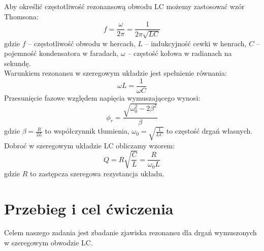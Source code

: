 \documentclass{article}
\begin{document}
Aby określić częstotliwość rezonansową obwodu LC możemy zastosować wzór Thomsona:
$$f= \frac{\omega}{2\pi} = \frac{1}{2\pi \sqrt{LC}}$$
gdzie $f$ – częstotliwość obwodu w hercach, $L$ – indukcyjność cewki w henrach, $C$ – pojemność kondensatora w faradach, $\omega$ – częstość kołowa w radianach na sekundę. \\
Warunkiem rezonansu w szeregowym  układzie jest spełnienie równania:
$$\omega L  = \frac{1}{\omega C}$$
Przesunięcie fazowe względem napięcia wymuszającego wynosi:
$$\phi_r = \frac{\sqrt{\omega_0^2 - 2\beta^2}}{\beta}$$
gdzie $\beta = \frac{R}{2L}$ to współczynnik tłumienia, $\omega_0 = \sqrt{\frac{1}{LC}}$ to częstość drgań własnych.\\
Dobroć w szeregowym układzie LC obliczamy wzorem:
$$ Q = R\sqrt{\frac{C}{L}} = \frac{R}{\omega_0 L}$$
gdzie $R$ to zastępcza szeregowa rezystancja układu.

\section{Przebieg i cel ćwiczenia}
Celem naszego zadania jest zbadanie zjawiska rezonansu dla drgań wymuszonych w szeregowym obwodzie LC.
\end{document}
